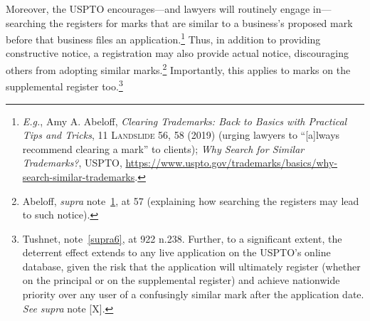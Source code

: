 \documentclass[letterpaper, 11pt, oneside]{article}
\begin{document}
Moreover, the USPTO encourages—and lawyers will routinely engage in—searching the registers for marks that are similar to a business's proposed mark before that business files an application.\footnote{\label{supra9} \textit{E.g.}, Amy A. Abeloff, \textit{Clearing Trademarks: Back to Basics with Practical Tips and Tricks}, 11 \textsc{Landslide} 56, 58 (2019) (urging lawyers to ``[a]lways recommend clearing a mark'' to clients); \textit{Why Search for Similar Trademarks?}, USPTO, \url{https://www.uspto.gov/trademarks/basics/why-search-similar-trademarks}.} Thus, in addition to providing constructive notice, a registration may also provide actual notice, discouraging others from adopting similar marks.\footnote{Abeloff, \textit{supra} note~\ref{supra9}, at 57 (explaining how searching the registers may lead to such notice).} Importantly, this applies to marks on the supplemental register too.\footnote{Tushnet, note~\ref{supra6}, at 922 n.238. Further, to a significant extent, the deterrent effect extends to any live application on the USPTO's online database, given the risk that the application will ultimately register (whether on the principal or on the supplemental register) and achieve nationwide priority over any user of a confusingly similar mark after the application date. \textit{See supra} note [X].}
\end{document}
